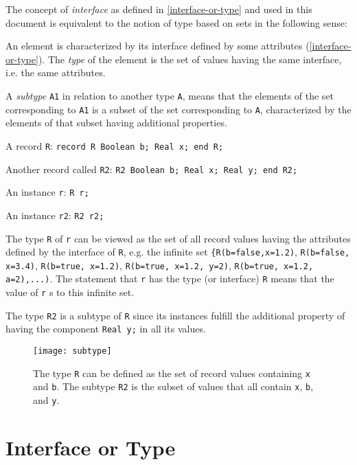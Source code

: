 The concept of \emph{interface} as defined in \autoref{interface-or-type} and used in
this document is equivalent to the notion of type based on sets in the
following sense:

An element is characterized by its interface defined by some attributes
(\autoref{interface-or-type}). The \emph{type} of the element is the set of values
having the same interface, i.e. the same attributes.

A \emph{subtype} \lstinline!A1! in relation to another type \lstinline!A!, means that the
elements of the set corresponding to \lstinline!A1! is a subset of the set
corresponding to \lstinline!A!, characterized by the elements of that subset having
additional properties.

\begin{example}
A record \lstinline!R!: \lstinline!record R Boolean b; Real x; end R;!

Another record called \lstinline!R2!: \lstinline!R2 Boolean b; Real x; Real y; end R2;!

An instance \lstinline!r!: \lstinline!R r;!

An instance \lstinline!r2!: \lstinline!R2 r2;!

The type \lstinline!R! of \lstinline!r! can be viewed as the set of all
record values having the attributes defined by the interface of
\lstinline!R!, e.g. the infinite set \lstinline!{R(b=false,x=1.2)!, \lstinline!R(b=false, x=3.4)!,
\lstinline!R(b=true, x=1.2)!, \lstinline!R(b=true, x=1.2, y=2)!,
\lstinline!R(b=true, x=1.2, a=2),...)!. The statement that \lstinline!r! has the type (or
interface) \lstinline!R! means that the value of \lstinline!r! s to this
infinite set.

The type \lstinline!R2! is a subtype of \lstinline!R! since its instances
fulfill the additional property of having the component \lstinline!Real y;!
in all its values.

\begin{figure}[H]
\caption{The type \lstinline!R! can be defined as the set of
record values containing \lstinline!x! and \lstinline!b!. The subtype \lstinline!R2! is the subset of values
that all contain \lstinline!x!, \lstinline!b!, and \lstinline!y!.}
\texttt{[image: subtype]}
\end{figure}
\end{example}

\section{Interface or Type}

